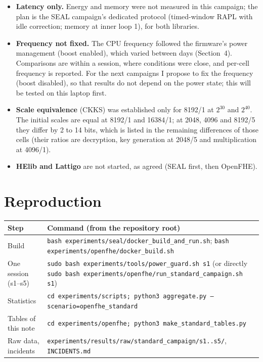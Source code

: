 \documentclass[11pt]{article}
\begin{document}
\begin{itemize}[leftmargin=*, itemsep=2pt]
  \item \textbf{Latency only.} Energy and memory were not measured in this campaign; the plan is the SEAL campaign's dedicated protocol (timed-window RAPL with idle correction; memory at inner loop 1), for both libraries.
  \item \textbf{Frequency not fixed.} The CPU frequency followed the firmware's power management (boost enabled), which varied between days (Section~4). Comparisons are within a session, where conditions were close, and per-cell frequency is reported. For the next campaigns I propose to fix the frequency (boost disabled), so that results do not depend on the power state; this will be tested on this laptop first.
  \item \textbf{Scale equivalence} (CKKS) was established only for 8192/1 at $2^{30}$ and $2^{40}$. The initial scales are equal at 8192/1 and 16384/1; at 2048, 4096 and 8192/5 they differ by 2 to 14 bits, which is listed in the remaining differences of those cells (their ratios are decryption, key generation at 2048/5 and multiplication at 4096/1).
  \item \textbf{HElib and Lattigo} are not started, as agreed (SEAL first, then OpenFHE).
\end{itemize}

\section{Reproduction}

{\footnotesize
\begin{tabular}{@{}L{4.0cm}L{12.5cm}@{}}
\toprule
Step & Command (from the repository root) \\
\midrule
Build & \texttt{bash experiments/seal/docker\_build\_and\_run.sh}; \texttt{bash experiments/openfhe/docker\_build.sh} \\
One session (s1--s5) & \texttt{sudo bash experiments/tools/power\_guard.sh s1} (or directly \texttt{sudo bash experiments/openfhe/run\_standard\_campaign.sh s1}) \\
Statistics & \texttt{cd experiments/scripts; python3 aggregate.py --scenario=openfhe\_standard} \\
Tables of this note & \texttt{cd experiments/openfhe; python3 make\_standard\_tables.py} \\
Raw data, incidents & \texttt{experiments/results/raw/standard\_campaign/s1..s5/}, \texttt{INCIDENTS.md} \\
\bottomrule
\end{tabular}}
\end{document}
